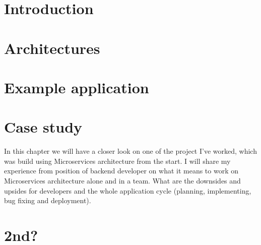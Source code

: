 \chapter*{Introduction}


\setcounter{page}{1}

\begin{chapterabstract}
    \lipsum[1]
\end{chapterabstract}

\lipsum[1]

\chapter{Architectures}





\chapter{Example application}


\chapter{Case study}
\label{chapter:personal_experience}
In this chapter we will have a closer look on one of the project I've worked, which was build using Microservices architecture from the start. I will share my experience from position of backend developer on what it means to work on Microservices architecture alone and in a team. What are the downsides and upsides for developers and the whole application cycle (planning, implementing, bug fixing and deployment).



\chapter{2nd?}
